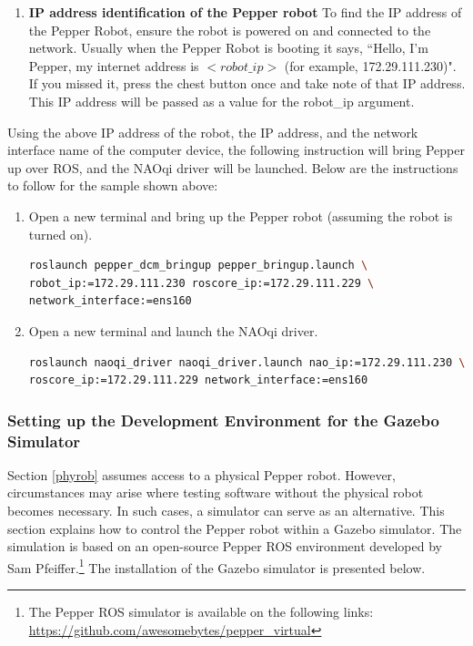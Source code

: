 \documentclass{CSSRforAfrica}
\begin{document}
{{\begin{enumerate}
\item \textbf{IP address identification of the Pepper robot}
To find the IP address of the Pepper Robot, ensure the robot is powered on and connected to the network. Usually when the Pepper Robot is booting it says, ``Hello, I'm Pepper, my internet address is $<robot\_ip >$ (for example, 172.29.111.230)". If you missed it, press the chest button once and take note of that IP address. This IP address will be passed as a value for the robot\_ip argument.

\end{enumerate}
\noindent Using the above IP address of the robot, the IP address, and the network interface name of the computer device, the following instruction will bring Pepper up over ROS, and the NAOqi driver will be launched. Below are the instructions to follow for the sample shown above:

\begin{enumerate}
\item Open a new terminal and bring up the Pepper robot (assuming the robot is turned on).
\begin{lstlisting}[style=withoutNumbering, language=bash]
roslaunch pepper_dcm_bringup pepper_bringup.launch \
robot_ip:=172.29.111.230 roscore_ip:=172.29.111.229 \
network_interface:=ens160
\end{lstlisting}

\item Open a new terminal and launch the NAOqi driver.
\begin{lstlisting}[style=withoutNumbering, language=bash]
roslaunch naoqi_driver naoqi_driver.launch nao_ip:=172.29.111.230 \
roscore_ip:=172.29.111.229 network_interface:=ens160
\end{lstlisting} 
\end{enumerate}
}

\subsubsection{Setting up the Development Environment for the Gazebo Simulator}
\label{simulator}
Section \ref{phyrob} assumes access to a physical Pepper robot. However, circumstances may arise where testing software without the physical robot becomes necessary. In such cases, a simulator can serve as an alternative. This section explains how to control the Pepper robot within a Gazebo simulator. The simulation is based on an open-source Pepper ROS environment developed by Sam Pfeiffer.\footnote{The Pepper ROS simulator is available on the following links: \url{https://github.com/awesomebytes/pepper\_virtual}} The installation of the Gazebo simulator is presented below.

}
\end{document}
